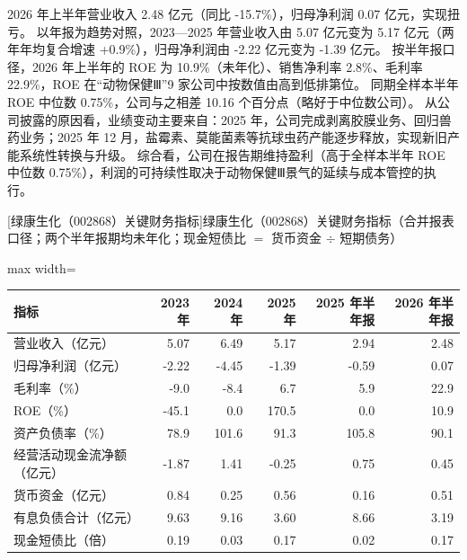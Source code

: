  2026 年上半年营业收入 2.48 亿元（同比 -15.7\%），归母净利润 0.07 亿元，实现扭亏。 以年报为趋势对照，2023---2025 年营业收入由 5.07 亿元变为 5.17 亿元（两年年均复合增速 +0.9\%），归母净利润由 -2.22 亿元变为 -1.39 亿元。 按半年报口径，2026 年上半年的 ROE 为 10.9\%（未年化）、销售净利率 2.8\%、毛利率 22.9\%，ROE 在“动物保健Ⅲ”9 家公司中按数值由高到低排第位。 同期全样本半年 ROE 中位数 0.75\%，公司与之相差 10.16 个百分点（略好于中位数公司）。 从公司披露的原因看，业绩变动主要来自：2025 年，公司完成剥离胶膜业务、回归兽药业务；2025 年 12 月，盐霉素、莫能菌素等抗球虫药产能逐步释放，实现新旧产能系统性转换与升级。 综合看，公司在报告期维持盈利（高于全样本半年 ROE 中位数 0.75\%），利润的可持续性取决于动物保健Ⅲ景气的延续与成本管控的执行。

\begin{center}\small\setlength{\tabcolsep}{3.4pt}
[绿康生化（002868）关键财务指标]{绿康生化（002868）关键财务指标（合并报表口径；两个半年报期均未年化；现金短债比 $=$ 货币资金 $\div$ 短期债务）}
\begin{adjustbox}{max width=\textwidth}
\begin{tabular}{@{}lrrrrr@{}}
\toprule
指标 & 2023 年 & 2024 年 & 2025 年 & 2025 年半年报 & 2026 年半年报 \\
\midrule
营业收入（亿元） & 5.07 & 6.49 & 5.17 & 2.94 & 2.48 \\
归母净利润（亿元） & -2.22 & -4.45 & -1.39 & -0.59 & 0.07 \\
毛利率（\%） & -9.0 & -8.4 & 6.7 & 5.9 & 22.9 \\
ROE（\%） & -45.1 & 0.0 & 170.5 & 0.0 & 10.9 \\
资产负债率（\%） & 78.9 & 101.6 & 91.3 & 105.8 & 90.1 \\
经营活动现金流净额（亿元） & -1.87 & 1.41 & -0.25 & 0.75 & 0.45 \\
货币资金（亿元） & 0.84 & 0.25 & 0.56 & 0.16 & 0.51 \\
有息负债合计（亿元） & 9.63 & 9.16 & 3.60 & 8.66 & 3.19 \\
现金短债比（倍） & 0.19 & 0.03 & 0.17 & 0.02 & 0.17 \\
\bottomrule
\end{tabular}
\end{adjustbox}
\end{center}

